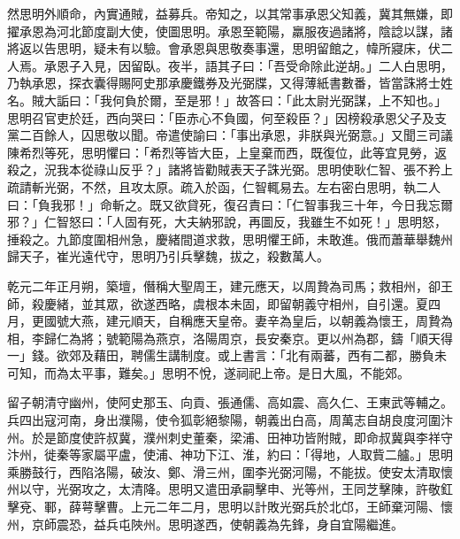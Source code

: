 \begin{pinyinscope}
 然思明外順命，內實通賊，益募兵。帝知之，以其常事承恩父知義，冀其無嫌，即擢承恩為河北節度副大使，使圖思明。承恩至範陽，羸服夜過諸將，陰諗以謀，諸將返以告思明，疑未有以驗。會承恩與思敬奏事還，思明留館之，幃所寢床，伏二人焉。承恩子入見，因留臥。夜半，語其子曰：「吾受命除此逆胡。」二人白思明，乃執承恩，探衣囊得賜阿史那承慶鐵券及光弼牒，又得薄紙書數番，皆當誅將士姓名。賊大詬曰：「我何負於爾，至是邪！」故答曰：「此太尉光弼謀，上不知也。」思明召官吏於廷，西向哭曰：「臣赤心不負國，何至殺臣？」因榜殺承恩父子及支黨二百餘人，囚思敬以聞。帝遣使諭曰：「事出承恩，非朕與光弼意。」又聞三司議陳希烈等死，思明懼曰：「希烈等皆大臣，上皇棄而西，既復位，此等宜見勞，返殺之，況我本從祿山反乎？」諸將皆勸賊表天子誅光弼。思明使耿仁智、張不矜上疏請斬光弼，不然，且攻太原。疏入於函，仁智輒易去。左右密白思明，執二人曰：「負我邪！」命斬之。既又欲貸死，復召責曰：「仁智事我三十年，今日我忘爾邪？」仁智怒曰：「人固有死，大夫納邪說，再圖反，我雖生不如死！」思明怒，捶殺之。九節度圍相州急，慶緒間道求救，思明懼王師，未敢進。俄而蕭華舉魏州歸天子，崔光遠代守，思明乃引兵擊魏，拔之，殺數萬人。



 乾元二年正月朔，築壇，僭稱大聖周王，建元應天，以周贄為司馬；救相州，卻王師，殺慶緒，並其眾，欲遂西略，虞根本未固，即留朝義守相州，自引還。夏四月，更國號大燕，建元順天，自稱應天皇帝。妻辛為皇后，以朝義為懷王，周贄為相，李歸仁為將；號範陽為燕京，洛陽周京，長安秦京。更以州為郡，鑄「順天得一」錢。欲郊及藉田，聘儒生講制度。或上書言：「北有兩蕃，西有二都，勝負未可知，而為太平事，難矣。」思明不悅，遂祠祀上帝。是日大風，不能郊。



 留子朝清守幽州，使阿史那玉、向貢、張通儒、高如震、高久仁、王東武等輔之。兵四出寇河南，身出濮陽，使令狐彰絕黎陽，朝義出白高，周萬志自胡良度河圍汴州。於是節度使許叔冀，濮州刺史董秦，梁浦、田神功皆附賊，即命叔冀與李祥守汴州，徙秦等家屬平盧，使浦、神功下江、淮，約曰：「得地，人取貲二艫。」思明乘勝鼓行，西陷洛陽，破汝、鄭、滑三州，圍李光弼河陽，不能拔。使安太清取懷州以守，光弼攻之，太清降。思明又遣田承嗣擊申、光等州，王同芝擊陳，許敬釭擊兗、鄆，薛萼擊曹。上元二年二月，思明以計敗光弼兵於北邙，王師棄河陽、懷州，京師震恐，益兵屯陜州。思明遂西，使朝義為先鋒，身自宜陽繼進。




\end{pinyinscope}
